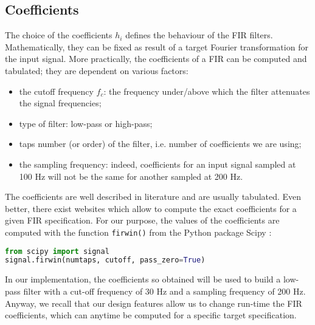 \subsection{Coefficients}
\label{ssec:coefficients}

The choice of the coefficients $h_i$ defines the behaviour of the FIR filters. Mathematically, they can be fixed as result of a target Fourier transformation for the input signal. More practically, the coefficients of a FIR can be computed and tabulated; they are dependent on various factors:
\begin{itemize}
    \item the cutoff frequency $f_c$: the frequency under/above which the filter attenuates the signal frequencies;
    \item type of filter: low-pass or high-pass;
    \item taps number (or order) of the filter, i.e. number of coefficients we are using;
    \item the sampling frequency: indeed, coefficients for an input signal sampled at 100 Hz will not be the same for another sampled at 200 Hz.
\end{itemize}

The coefficients are well described in literature and are usually tabulated. Even better, there exist websites \cite{tfilter} which allow to compute the exact coefficients for a given FIR specification. For our purpose, the values of the coefficients are computed with the function \texttt{firwin()} from the Python package Scipy \cite{scipy_firwin}:

\begin{lstlisting}[language=Python]
from scipy import signal
signal.firwin(numtaps, cutoff, pass_zero=True)
\end{lstlisting}

In our implementation, the coefficients so obtained will be used to build a low-pass filter with a cut-off frequency of 30 Hz and a sampling frequency of 200 Hz. Anyway, we recall that our design features allow us to change run-time the FIR coefficients, which can anytime be computed for a specific target specification.


\begin{table}[H]
    \renewcommand{\arraystretch}{1.2}
    \centering
    \caption{The FIR coefficients used as default filter specifications: 200Hz sampling and cutoff frequency of 30Hz, low-pass. Notice that coefficients are symmetric.}
    \label{tab:coeff}
\end{table}

